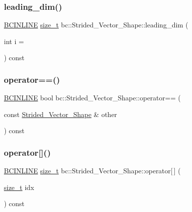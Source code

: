 \subsubsection{\texorpdfstring{leading\+\_\+dim()}{leading\_dim()}}
{\footnotesize\ttfamily \hyperlink{common_8h_a6699e8b0449da5c0fafb878e59c1d4b1}{B\+C\+I\+N\+L\+I\+NE} \hyperlink{namespacebc_aaf8e3fbf99b04b1b57c4f80c6f55d3c5}{size\+\_\+t} bc\+::\+Strided\+\_\+\+Vector\+\_\+\+Shape\+::leading\+\_\+dim (\begin{DoxyParamCaption}\item[{int}]{i = {} }\end{DoxyParamCaption}) const\hspace{0.3cm}{\ttfamily [inline]}}

\mbox{\label{structbc_1_1Strided__Vector__Shape_a9e6307c2a835653c169774a72b526df8}} 
\subsubsection{\texorpdfstring{operator==()}{operator==()}}
{\footnotesize\ttfamily \hyperlink{common_8h_a6699e8b0449da5c0fafb878e59c1d4b1}{B\+C\+I\+N\+L\+I\+NE} bool bc\+::\+Strided\+\_\+\+Vector\+\_\+\+Shape\+::operator== (\begin{DoxyParamCaption}\item[{const \hyperlink{structbc_1_1Strided__Vector__Shape}{Strided\+\_\+\+Vector\+\_\+\+Shape} \&}]{other }\end{DoxyParamCaption}) const\hspace{0.3cm}{\ttfamily [inline]}}

\mbox{\label{structbc_1_1Strided__Vector__Shape_a3a2580a96553ea02887e81e0afcca9b3}} 
\subsubsection{\texorpdfstring{operator[]()}{operator[]()}}
{\footnotesize\ttfamily \hyperlink{common_8h_a6699e8b0449da5c0fafb878e59c1d4b1}{B\+C\+I\+N\+L\+I\+NE} \hyperlink{namespacebc_aaf8e3fbf99b04b1b57c4f80c6f55d3c5}{size\+\_\+t} bc\+::\+Strided\+\_\+\+Vector\+\_\+\+Shape\+::operator\mbox{[}$\,$\mbox{]} (\begin{DoxyParamCaption}\item[{\hyperlink{namespacebc_aaf8e3fbf99b04b1b57c4f80c6f55d3c5}{size\+\_\+t}}]{idx }\end{DoxyParamCaption}) const\hspace{0.3cm}{\ttfamily [inline]}}

